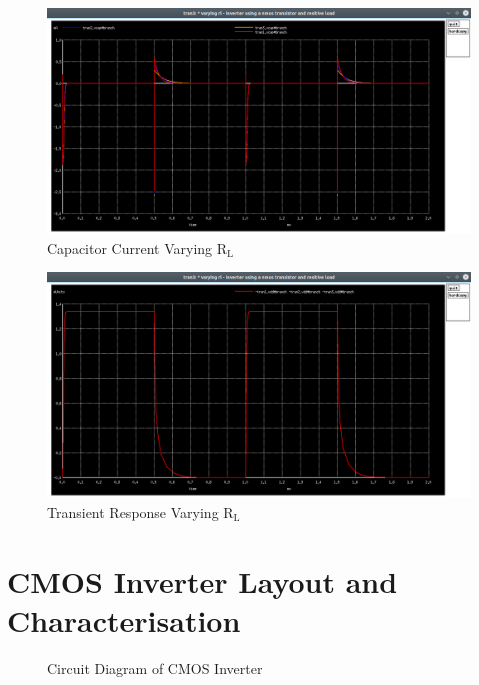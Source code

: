 \documentclass[12pt]{article}
\begin{document}
	\begin{figure}[H]
		\begin{center}
			\includegraphics[scale=0.25]{images/inverter_Rl_vcap.png}
			\caption{Capacitor Current Varying $\text{R}_\text{L}$}
			\label{fig::varying_rl_vcap}
		\end{center}
	\end{figure}
	
	\begin{figure}[H]
		\begin{center}
			\includegraphics[scale=0.25]{images/inverter_Rl_vdd.png}
			\caption{Transient Response Varying $\text{R}_\text{L}$}
			\label{fig::varying_rl_vdd}
		\end{center}
	\end{figure}
	
	
	
	\newpage
	\section{CMOS Inverter Layout and Characterisation} 
	\begin{figure}[H]
		\begin{center}
			
			\caption{Circuit Diagram of CMOS Inverter}
			\label{fig::cmosinvckt}
		\end{center}
	\end{figure}
	
	
\end{document}
